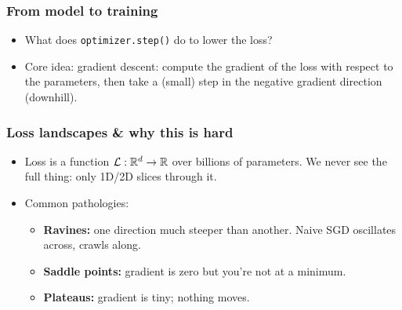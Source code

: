 \begin{frame}
\frametitle{From model to training}
\begin{itemize}
    \item What does \texttt{optimizer.step()} do to lower the loss?
    \pause
    \item Core idea: gradient descent: compute the gradient of the loss
    with respect to the parameters, then take a (small) step in the negative
    gradient direction (downhill).
\end{itemize}
\end{frame}

\begin{frame}
\frametitle{Loss landscapes \& why this is hard}
\begin{itemize}
    \item Loss is a function $\mathcal{L} : \mathbb{R}^d \to \mathbb{R}$ over billions of
    parameters. We never see the full thing: only 1D/2D slices through it.
    \pause
    \item Common pathologies:
    \begin{itemize}
        \item \textbf{Ravines:} one direction much steeper than another.
        Naive SGD oscillates across, crawls along.
        \pause
        \item \textbf{Saddle points:} gradient is zero but you're not at a
        minimum.
        \pause
        \item \textbf{Plateaus:} gradient is tiny; nothing moves.
    \end{itemize}
\end{itemize}
\begin{center}
\end{center}
\end{frame}

